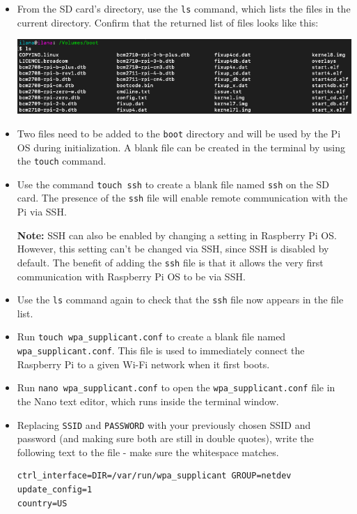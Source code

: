 \documentclass{article}
\begin{document}
\begin{itemize}
    \item From the SD card's directory, use the \texttt{ls} command, which lists the files in the current directory. Confirm that the returned list of files looks like this:
    
    \includegraphics[width=\textwidth]{images/sd-card-ls.png}

    \item Two files need to be added to the \texttt{boot} directory and will be used by the Pi OS during initialization. A blank file can be created in the terminal by using the \texttt{touch} command. 
    
    \item Use the command \texttt{touch ssh} to create a blank file named \texttt{ssh} on the SD card. The presence of the \texttt{ssh} file will enable remote communication with the Pi via SSH. 
    
    \textbf{Note:} SSH can also be enabled by changing a setting in Raspberry Pi OS. However, this setting can't be changed via SSH, since SSH is disabled by default. The benefit of adding the \texttt{ssh} file is that it allows the very first communication with Raspberry Pi OS to be via SSH.
    
    \item Use the \texttt{ls} command again to check that the \texttt{ssh} file now appears in the file list.
    
    \item Run \texttt{touch wpa\_supplicant.conf} to create a blank file named \texttt{wpa\_supplicant.conf}. This file is used to immediately connect the Raspberry Pi to a given Wi-Fi network when it first boots.
    
    \item Run \texttt{nano wpa\_supplicant.conf} to open the \texttt{wpa\_supplicant.conf} file in the Nano text editor, which runs inside the terminal window.
    
    \item Replacing \texttt{SSID} and \texttt{PASSWORD} with your previously chosen SSID and password (and making sure both are still in double quotes), write the following text to the file - make sure the whitespace matches.
\begin{verbatim}
ctrl_interface=DIR=/var/run/wpa_supplicant GROUP=netdev
update_config=1
country=US


\end{verbatim}
\end{itemize}
\end{document}
